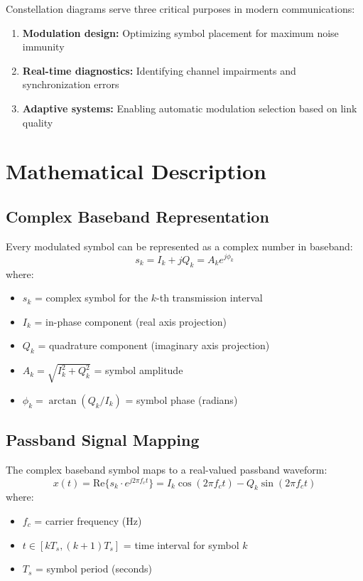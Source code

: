 Constellation diagrams serve three critical purposes in modern communications:
\begin{enumerate}
\item \textbf{Modulation design:} Optimizing symbol placement for maximum noise immunity
\item \textbf{Real-time diagnostics:} Identifying channel impairments and synchronization errors
\item \textbf{Adaptive systems:} Enabling automatic modulation selection based on link quality
\end{enumerate}

\section{Mathematical Description}

\subsection{Complex Baseband Representation}

Every modulated symbol can be represented as a complex number in baseband:
\begin{equation}
s_k = I_k + jQ_k = A_k e^{j\phi_k}
\end{equation}
where:
\begin{itemize}
\item $s_k$ = complex symbol for the $k$-th transmission interval
\item $I_k$ = in-phase component (real axis projection)
\item $Q_k$ = quadrature component (imaginary axis projection)
\item $A_k = \sqrt{I_k^2 + Q_k^2}$ = symbol amplitude
\item $\phi_k = \arctan(Q_k/I_k)$ = symbol phase (radians)
\end{itemize}

\subsection{Passband Signal Mapping}

The complex baseband symbol maps to a real-valued passband waveform:
\begin{equation}
x(t) = \mathrm{Re}\{s_k \cdot e^{j2\pi f_c t}\} = I_k\cos(2\pi f_c t) - Q_k\sin(2\pi f_c t)
\end{equation}
where:
\begin{itemize}
\item $f_c$ = carrier frequency (Hz)
\item $t \in [kT_s, (k+1)T_s]$ = time interval for symbol $k$
\item $T_s$ = symbol period (seconds)
\end{itemize}

